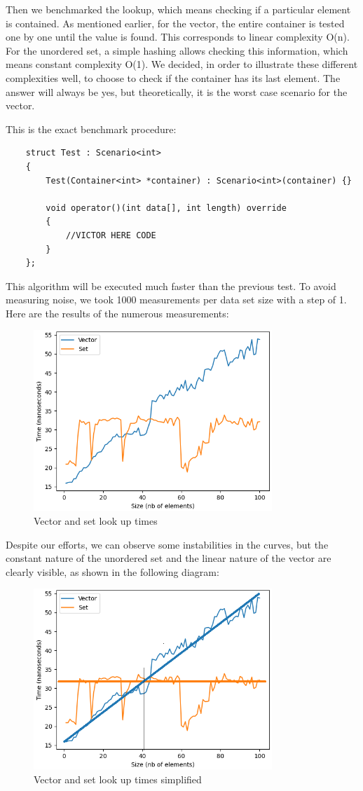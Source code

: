 \documentclass[conference]{IEEEtran} \IEEEoverridecommandlockouts
\begin{document}
Then we benchmarked the lookup, which means checking if a particular 
element is contained. As mentioned earlier, for the vector, the entire 
container is tested one by one until the value is found. This 
corresponds to linear complexity O(n). For the unordered set, a simple 
hashing allows checking this information, which means constant 
complexity O(1). We decided, in order to illustrate these different 
complexities well, to choose to check if the container has its last 
element. The answer will always be yes, but theoretically, it is the 
worst case scenario for the vector.

This is the exact benchmark procedure:
\begin{lstlisting}
	struct Test : Scenario<int>
	{
		Test(Container<int> *container) : Scenario<int>(container) {}
		
		void operator()(int data[], int length) override
		{
			//VICTOR HERE CODE
		}
	};
\end{lstlisting}


This algorithm will be executed much faster than the previous test. 
To avoid measuring noise, we took 1000 measurements per data set size 
with a step of 1. Here are the results of the numerous measurements:
\begin{figure}[!h]
	\includegraphics[width=9cm]{Diagram/lookup.png}
	\caption{Vector and set look up times}
	\label{vector vs set lookup}
\end{figure}

Despite our efforts, we can observe some instabilities in the curves, 
but the constant nature of the unordered set and the linear nature of 
the vector are clearly visible, as shown in the following diagram:
\begin{figure}[!h]
	\includegraphics[width=9cm]{Diagram/lookup_courbe.png}
	\caption{Vector and set look up times simplified}
	\label{vector vs set lookup curve}
\end{figure}
\end{document}
